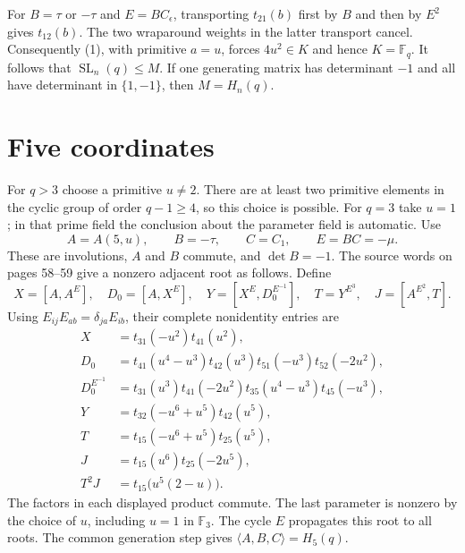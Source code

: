\documentclass[11pt,a4paper]{article}
\newcommand{\SL}{\operatorname{SL}}
\newcommand{\F}{\mathbb F}
\begin{document}
For $B=\tau$ or $-\tau$ and $E=BC_\epsilon$, transporting
$t_{21}(b)$ first by $B$ and then by $E^2$ gives $t_{12}(b)$.
The two wraparound weights in the latter transport cancel.
Consequently (1), with primitive $a=u$, forces
$4u^2\in K$ and hence $K=\F_q$. It follows that
$\SL_n(q)\le M$. If one generating matrix has determinant $-1$
and all have determinant in $\{1,-1\}$, then $M=H_n(q)$.

\section{Five coordinates}
For $q>3$ choose a primitive $u\ne2$. There are at least two
primitive elements in the cyclic group of order $q-1\ge4$, so
this choice is possible. For $q=3$ take $u=1$; in that prime field
the conclusion about the parameter field is automatic. Use
\[
 A=A(5,u),\qquad B=-\tau,\qquad C=C_1,\qquad E=BC=-\mu.
\]
These are involutions, $A$ and $B$ commute, and $\det B=-1$.
The source words on pages 58--59 give a nonzero adjacent root as
follows. Define
\[
 X=[A,A^E],\quad D_0=[A,X^E],\quad
 Y=[X^E,D_0^{E^{-1}}],\quad T=Y^{E^3},\quad J=[A^{E^2},T].
\]
Using $E_{ij}E_{ab}=\delta_{ja}E_{ib}$, their complete nonidentity
entries are
\begin{align*}
 X&=t_{31}(-u^2)t_{41}(u^2),\\
 D_0&=t_{41}(u^4-u^3)t_{42}(u^3)t_{51}(-u^3)t_{52}(-2u^2),\\
 D_0^{E^{-1}}&=t_{31}(u^3)t_{41}(-2u^2)
                  t_{35}(u^4-u^3)t_{45}(-u^3),\\
 Y&=t_{32}(-u^6+u^5)t_{42}(u^5),\\
 T&=t_{15}(-u^6+u^5)t_{25}(u^5),\\
 J&=t_{15}(u^6)t_{25}(-2u^5),\\
 T^2J&=t_{15}\bigl(u^5(2-u)\bigr).
\end{align*}
The factors in each displayed product commute. The last parameter
is nonzero by the choice of $u$, including $u=1$ in $\F_3$.
The cycle $E$ propagates this root to all roots. The common
generation step gives $\langle A,B,C\rangle=H_5(q)$.
\end{document}
